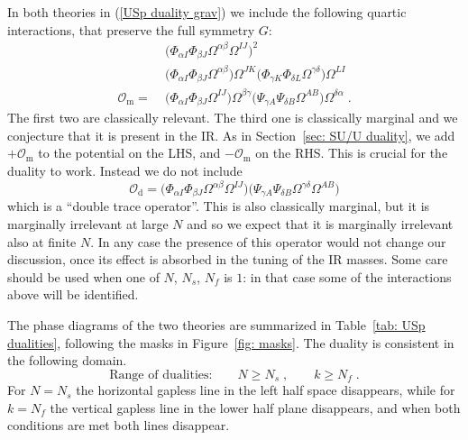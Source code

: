 \documentclass[a4paper, 12pt]{article}
\numberwithin{equation}{section}
\newcommand{\be}{\begin{equation}} \newcommand{\ee}{\end{equation}}
\newcommand{\bea}{\begin{equation} \begin{aligned}} \newcommand{\eea}{\end{aligned} \end{equation}}
\newcommand{\cO}{\mathcal{O}}
\begin{document}
In both theories in (\ref{USp duality grav}) we include the following quartic interactions, that preserve the full symmetry $G$:
\bea
\label{USp relevant couplings}
& \big( \Phi_{\alpha I} \Phi_{\beta J} \Omega^{\alpha\beta} \Omega^{IJ} \big)^2 \\
& \big( \Phi_{\alpha I} \Phi_{\beta J} \Omega^{\alpha\beta} \big) \Omega^{JK} \big( \Phi_{\gamma K} \Phi_{\delta L} \Omega^{\gamma\delta} \Big) \Omega^{LI} \\
\cO_\text{m} = \; & \big( \Phi_{\alpha I} \Phi_{\beta J} \Omega^{IJ} \big) \Omega^{\beta\gamma} \big( \Psi_{\gamma A} \Psi_{\delta B} \Omega^{AB} \Big) \Omega^{\delta\alpha} \;.
\eea
The first two are classically relevant. The third one is classically marginal and we conjecture that it is present in the IR. As in Section~\ref{sec: SU/U duality}, we add $+\cO_\text{m}$ to the potential on the LHS, and $-\cO_\text{m}$ on the RHS. This is crucial for the duality to work. Instead we do not include
\be
\label{Phi^2 Psi^2 USp(2N) diagonal}
\cO_\text{d} = \big( \Phi_{\alpha I} \Phi_{\beta J} \Omega^{\alpha\beta} \Omega^{IJ} \big) \big( \Psi_{\gamma A} \Psi_{\delta B} \Omega^{\gamma\delta} \Omega^{AB} \Big)
\ee
which is a ``double trace operator''. This is also classically marginal, but it is marginally irrelevant at large $N$ and so we expect that it is marginally irrelevant also at finite $N$. In any case the presence of this operator would not change our discussion, once its effect is absorbed in the tuning of the IR masses. Some care should be used when one of $N$, $N_s$, $N_f$ is $1$: in that case some of the interactions above will be identified.

The phase diagrams of the two theories are summarized in Table~\ref{tab: USp dualities}, following the masks in Figure~\ref{fig: masks}. The duality is consistent in the following domain.
\be
\text{Range of dualities:} \qquad N \geq N_s\;,\qquad k \geq N_f \;.
\ee
For $N = N_s$ the horizontal gapless line in the left half space disappears, while for $k = N_f$ the vertical gapless line in the lower half plane disappears, and when both conditions are met both lines disappear.
\end{document}
